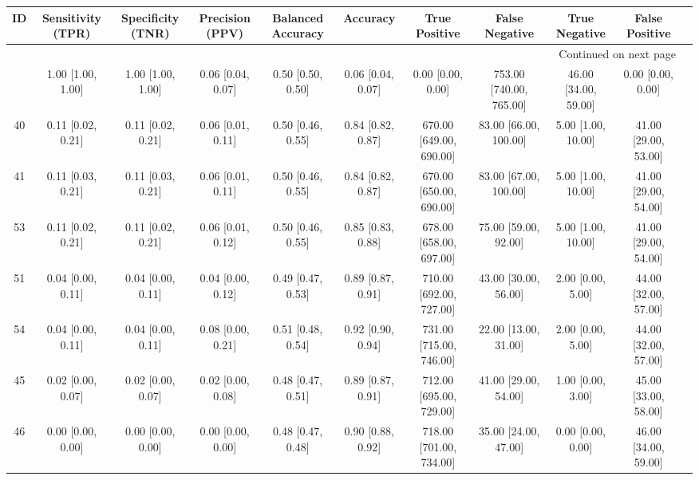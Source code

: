 \documentclass[8pt]{article}
\begin{document}
\begin{center}
\begin{footnotesize}
\begin{longtable}{|ccccccccccc|}
\toprule
 ID &  Sensitivity (TPR) &  Specificity (TNR) &    Precision (PPV) &  Balanced Accuracy &           Accuracy &            True Positive &           False Negative &         True Negative &        False Positive \\
\midrule
\endhead
\midrule
\multicolumn{10}{r}{{Continued on next page}} \\
\midrule
\endfoot

\bottomrule
\endlastfoot
 42 &  1.00 [1.00, 1.00] &  1.00 [1.00, 1.00] &  0.06 [0.04, 0.07] &  0.50 [0.50, 0.50] &  0.06 [0.04, 0.07] &        0.00 [0.00, 0.00] &  753.00 [740.00, 765.00] &  46.00 [34.00, 59.00] &     0.00 [0.00, 0.00] \\
 40 &  0.11 [0.02, 0.21] &  0.11 [0.02, 0.21] &  0.06 [0.01, 0.11] &  0.50 [0.46, 0.55] &  0.84 [0.82, 0.87] &  670.00 [649.00, 690.00] &    83.00 [66.00, 100.00] &    5.00 [1.00, 10.00] &  41.00 [29.00, 53.00] \\
 41 &  0.11 [0.03, 0.21] &  0.11 [0.03, 0.21] &  0.06 [0.01, 0.11] &  0.50 [0.46, 0.55] &  0.84 [0.82, 0.87] &  670.00 [650.00, 690.00] &    83.00 [67.00, 100.00] &    5.00 [1.00, 10.00] &  41.00 [29.00, 54.00] \\
 53 &  0.11 [0.02, 0.21] &  0.11 [0.02, 0.21] &  0.06 [0.01, 0.12] &  0.50 [0.46, 0.55] &  0.85 [0.83, 0.88] &  678.00 [658.00, 697.00] &     75.00 [59.00, 92.00] &    5.00 [1.00, 10.00] &  41.00 [29.00, 54.00] \\
 51 &  0.04 [0.00, 0.11] &  0.04 [0.00, 0.11] &  0.04 [0.00, 0.12] &  0.49 [0.47, 0.53] &  0.89 [0.87, 0.91] &  710.00 [692.00, 727.00] &     43.00 [30.00, 56.00] &     2.00 [0.00, 5.00] &  44.00 [32.00, 57.00] \\
 54 &  0.04 [0.00, 0.11] &  0.04 [0.00, 0.11] &  0.08 [0.00, 0.21] &  0.51 [0.48, 0.54] &  0.92 [0.90, 0.94] &  731.00 [715.00, 746.00] &     22.00 [13.00, 31.00] &     2.00 [0.00, 5.00] &  44.00 [32.00, 57.00] \\
 45 &  0.02 [0.00, 0.07] &  0.02 [0.00, 0.07] &  0.02 [0.00, 0.08] &  0.48 [0.47, 0.51] &  0.89 [0.87, 0.91] &  712.00 [695.00, 729.00] &     41.00 [29.00, 54.00] &     1.00 [0.00, 3.00] &  45.00 [33.00, 58.00] \\
 46 &  0.00 [0.00, 0.00] &  0.00 [0.00, 0.00] &  0.00 [0.00, 0.00] &  0.48 [0.47, 0.48] &  0.90 [0.88, 0.92] &  718.00 [701.00, 734.00] &     35.00 [24.00, 47.00] &     0.00 [0.00, 0.00] &  46.00 [34.00, 59.00] \\

\end{longtable}
\end{footnotesize}
\end{center}
\end{document}
